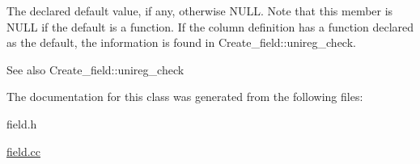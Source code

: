 The declared default value, if any, otherwise N\+U\+LL. Note that this member is N\+U\+LL if the default is a function. If the column definition has a function declared as the default, the information is found in Create\+\_\+field\+::unireg\+\_\+check.

\begin{DoxySeeAlso}{See also}
Create\+\_\+field\+::unireg\+\_\+check 
\end{DoxySeeAlso}


The documentation for this class was generated from the following files\+:\begin{DoxyCompactItemize}
\item 
field.\+h\item 
\mbox{\hyperlink{field_8cc}{field.\+cc}}\end{DoxyCompactItemize}

